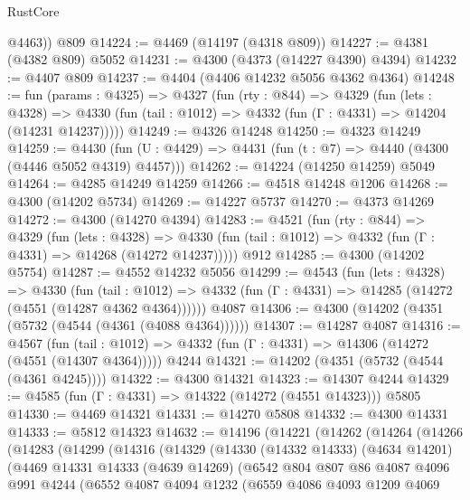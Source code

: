 \begin{lexlean}{RustCore}
\begin{coremodule}
        @4463))
    @809
@14224 := @4469 (@14197 (@4318 @809))
@14227 := @4381 (@4382 @809) @5052
@14231 := @4300 (@4373 (@14227 @4390) @4394)
@14232 := @4407 @809
@14237 := @4404 (@4406 @14232 @5056 @4362 @4364)
@14248 := fun (params : @4325) =>
  @4327
    (fun (rty : @844) =>
    @4329
      (fun (lets : @4328) =>
      @4330 (fun (tail : @1012) => @4332 (fun (Γ : @4331) => @14204 (@14231 @14237)))))
@14249 := @4326 @14248
@14250 := @4323 @14249
@14259 := @4430 (fun (U : @4429) => @4431 (fun (t : @7) => @4440 (@4300 (@4446 @5052 @4319) @4457)))
@14262 := @14224 (@14250 @14259) @5049
@14264 := @4285 @14249 @14259
@14266 := @4518 @14248 @1206
@14268 := @4300 (@14202 @5734)
@14269 := @14227 @5737
@14270 := @4373 @14269
@14272 := @4300 (@14270 @4394)
@14283 := @4521
    (fun (rty : @844) =>
    @4329
      (fun (lets : @4328) =>
      @4330 (fun (tail : @1012) => @4332 (fun (Γ : @4331) => @14268 (@14272 @14237)))))
    @912
@14285 := @4300 (@14202 @5754)
@14287 := @4552 @14232 @5056
@14299 := @4543
    (fun (lets : @4328) =>
    @4330
      (fun (tail : @1012) =>
      @4332 (fun (Γ : @4331) => @14285 (@14272 (@4551 (@14287 @4362 @4364))))))
    @4087
@14306 := @4300 (@14202 (@4351 (@5732 (@4544 (@4361 (@4088 @4364))))))
@14307 := @14287 @4087
@14316 := @4567
    (fun (tail : @1012) => @4332 (fun (Γ : @4331) => @14306 (@14272 (@4551 (@14307 @4364)))))
    @4244
@14321 := @14202 (@4351 (@5732 (@4544 (@4361 @4245))))
@14322 := @4300 @14321
@14323 := @14307 @4244
@14329 := @4585 (fun (Γ : @4331) => @14322 (@14272 (@4551 @14323))) @5805
@14330 := @4469 @14321
@14331 := @14270 @5808
@14332 := @4300 @14331
@14333 := @5812 @14323
@14632 := @14196
    (@14221
      (@14262
        (@14264
          (@14266
            (@14283
              (@14299
                (@14316
                  (@14329
                    (@14330
                      (@14332 @14333)
                      (@4634 @14201)
                      (@4469
                        @14331
                        @14333
                        (@4639 @14269)
                        (@6542
                          @804
                          @807
                          @86
                          @4087
                          @4096
                          @991
                          @4244
                          (@6552
                            @4087
                            @4094
                            @1232
                            (@6559
                              @4086
                              @4093
                              @1209
                              @4069

\end{coremodule}
\end{lexlean}

